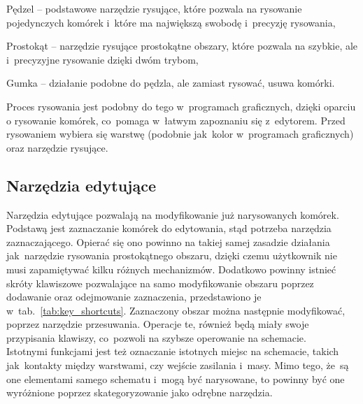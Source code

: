 \begin{citemize}
    \item Pędzel -- podstawowe narzędzie rysujące, które pozwala na rysowanie pojedynczych komórek
    i~które ma największą swobodę i~precyzję rysowania,
    \item Prostokąt -- narzędzie rysujące prostokątne obszary, które pozwala na szybkie,
    ale i~precyzyjne rysowanie dzięki dwóm trybom,
    \item Gumka -- działanie podobne do pędzla, ale zamiast rysować, usuwa komórki.
\end{citemize}

\indent Proces rysowania jest podobny do tego w~programach graficznych,
dzięki oparciu o rysowanie komórek, co~pomaga w~łatwym zapoznaniu się z~edytorem.
Przed rysowaniem wybiera się warstwę (podobnie jak~kolor w~programach graficznych) oraz narzędzie rysujące.

\subsection{Narzędzia edytujące}
\label{subsec:narzedzia_edytujace}

Narzędzia edytujące pozwalają na modyfikowanie już narysowanych komórek.
Podstawą jest zaznaczanie komórek do edytowania,
stąd potrzeba narzędzia zaznaczającego.
Opierać się ono powinno na takiej samej zasadzie działania jak~narzędzie rysowania prostokątnego obszaru,
dzięki czemu użytkownik nie musi zapamiętywać kilku różnych mechanizmów.
Dodatkowo powinny istnieć skróty klawiszowe pozwalające na samo modyfikowanie obszaru poprzez dodawanie
oraz odejmowanie zaznaczenia, przedstawiono je w~tab.~\ref{tab:key_shortcuts}.
Zaznaczony obszar można następnie modyfikować, poprzez narzędzie przesuwania.
Operacje te, również będą miały swoje przypisania klawiszy, co~pozwoli na szybsze operowanie na schemacie. \\
\indent Istotnymi funkcjami jest też oznaczanie istotnych miejsc na schemacie, takich jak~kontakty między warstwami,
czy wejście zasilania i~masy.
Mimo tego, że~są one elementami samego schematu i~mogą być narysowane,
to powinny być one wyróżnione poprzez skategoryzowanie jako odrębne narzędzia.

